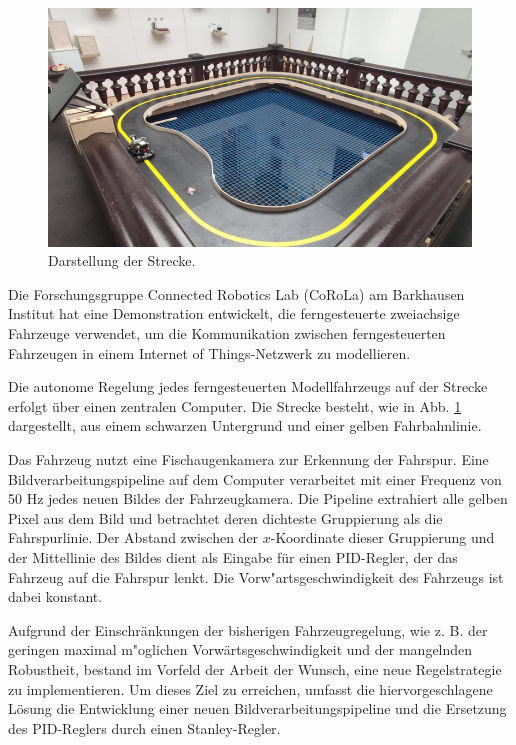 \documentclass[arbeit=studie,oneside,BCOR=12mm]{ArbeitRST}
\begin{document}
\begin{figure}[h]
    \centering
    \includegraphics[scale=0.48]{track_and_car}
    \caption{Darstellung der Strecke.}
    \label{track_and_car}
\end{figure}

Die Forschungsgruppe Connected Robotics Lab (CoRoLa) am Barkhausen Institut hat
eine Demonstration entwickelt, die ferngesteuerte zweiachsige Fahrzeuge
verwendet, um die Kommunikation zwischen ferngesteuerten Fahrzeugen in einem
\glqq Internet of Things\grqq-Netzwerk zu modellieren.

Die autonome Regelung jedes ferngesteuerten Modellfahrzeugs auf der Strecke
erfolgt über einen zentralen Computer. Die Strecke besteht, wie in Abb. \ref{track_and_car}
dargestellt, aus einem schwarzen Untergrund und einer gelben Fahrbahnlinie. 

Das Fahrzeug nutzt eine Fischaugenkamera zur Erkennung der Fahrspur. Eine
Bildverarbeitungspipeline auf dem Computer verarbeitet mit einer Frequenz von
50 Hz jedes neuen Bildes der Fahrzeugkamera. Die Pipeline extrahiert alle
gelben Pixel aus dem Bild und betrachtet deren dichteste Gruppierung als die
Fahrspurlinie. Der Abstand zwischen der $x$-Koordinate dieser Gruppierung und
der Mittellinie des Bildes dient als Eingabe für einen PID-Regler, der das
Fahrzeug auf die Fahrspur lenkt. Die Vorw"artsgeschwindigkeit des Fahrzeugs ist
dabei konstant.

Aufgrund der Einschränkungen der bisherigen Fahrzeugregelung, wie z. B. der
geringen maximal m"oglichen Vorwärtsgeschwindigkeit und der mangelnden
Robustheit, bestand im Vorfeld der Arbeit der Wunsch, eine neue Regelstrategie
zu implementieren. Um dieses Ziel zu erreichen, umfasst die hiervorgeschlagene
Lösung die Entwicklung einer neuen Bildverarbeitungspipeline und die Ersetzung des
PID-Reglers durch einen Stanley-Regler.
\end{document}
